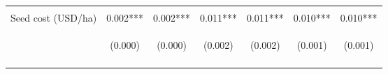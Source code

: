 \begin{center}
\begin{tabular}{lcccccc}
\vspace{4pt} & \begin{footnotesize}[0.744]\end{footnotesize} & \begin{footnotesize}[0.449]\end{footnotesize} & \begin{footnotesize}[0.876]\end{footnotesize} & \begin{footnotesize}[0.895]\end{footnotesize} & \begin{footnotesize}[0.000]\end{footnotesize} & \begin{footnotesize}[0.000]\end{footnotesize} \\
Seed cost (USD/ha) & 0.002*** & 0.002*** & 0.011*** & 0.011*** & 0.010*** & 0.010*** \\
 & \begin{footnotesize}(0.000)\end{footnotesize} & \begin{footnotesize}(0.000)\end{footnotesize} & \begin{footnotesize}(0.002)\end{footnotesize} & \begin{footnotesize}(0.002)\end{footnotesize} & \begin{footnotesize}(0.001)\end{footnotesize} & \begin{footnotesize}(0.001)\end{footnotesize} \\
\vspace{4pt} & \begin{footnotesize}[0.000]\end{footnotesize} & \begin{footnotesize}[0.000]\end{footnotesize} & \begin{footnotesize}[0.000]\end{footnotesize} & \begin{footnotesize}[0.000]\end{footnotesize} & \begin{footnotesize}[0.000]\end{footnotesize} & \begin{footnotesize}[0.000]\end{footnotesize} \\

\end{tabular}
\end{center}
